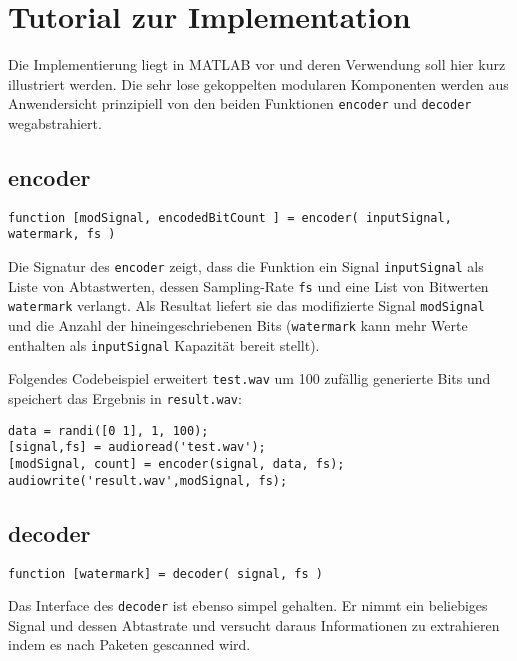 \chapter{Tutorial zur Implementation}
\label{ch:tutorial}

Die Implementierung liegt in MATLAB vor und deren Verwendung soll hier kurz illustriert werden. Die sehr lose gekoppelten modularen Komponenten werden aus Anwendersicht prinzipiell von den beiden Funktionen \texttt{encoder} und \texttt{decoder} wegabstrahiert. 

\section*{encoder}
\label{sec:encoder}

\begin{verbatim}
function [modSignal, encodedBitCount ] = encoder( inputSignal, watermark, fs )
\end{verbatim}

Die Signatur des \texttt{encoder} zeigt, dass die Funktion ein Signal \texttt{inputSignal} als Liste von Abtastwerten, dessen Sampling-Rate \texttt{fs} und eine List von Bitwerten \texttt{watermark} verlangt. Als Resultat liefert sie das modifizierte Signal \texttt{modSignal} und die Anzahl der hineingeschriebenen Bits (\texttt{watermark} kann mehr Werte enthalten als \texttt{inputSignal} Kapazität bereit stellt).

Folgendes Codebeispiel erweitert \texttt{test.wav} um 100 zufällig generierte Bits und speichert das Ergebnis in \texttt{result.wav}:

\begin{verbatim}
data = randi([0 1], 1, 100);
[signal,fs] = audioread('test.wav');
[modSignal, count] = encoder(signal, data, fs);
audiowrite('result.wav',modSignal, fs);
\end{verbatim}

\newpage


\section*{decoder}

\begin{verbatim}
function [watermark] = decoder( signal, fs )
\end{verbatim}

Das Interface des \texttt{decoder} ist ebenso simpel gehalten. Er nimmt ein beliebiges Signal und dessen Abtastrate und versucht daraus Informationen zu extrahieren indem es nach Paketen gescanned wird. 

